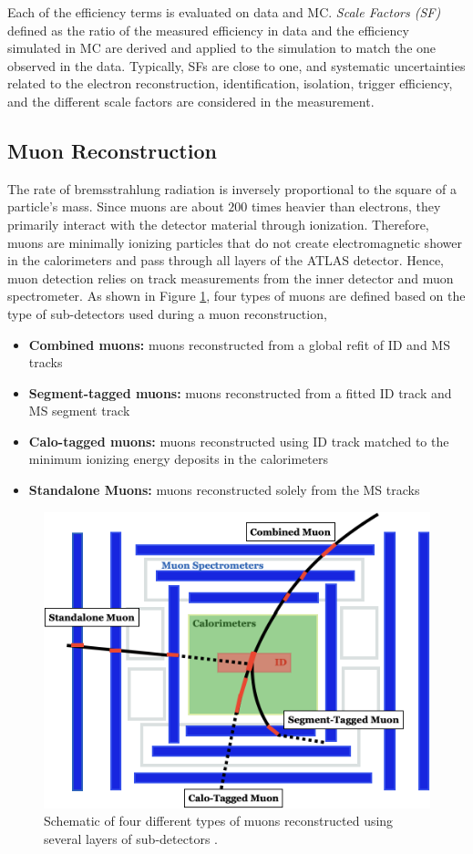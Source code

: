 Each of the efficiency terms is evaluated on data and MC. \textit{Scale Factors (SF)} defined as the ratio of the measured efficiency in data and the efficiency simulated in MC are derived and applied to the simulation to match the one observed in the data. Typically, SFs are close to one, and systematic uncertainties related to the electron reconstruction, identification, isolation, trigger efficiency, and the different scale factors are considered in the measurement.

\subsection{Muon Reconstruction}
\label{subsec:ParticleRecon_Muon}
The rate of bremsstrahlung radiation is inversely proportional to the square of a particle's mass. Since muons are about $200$ times heavier than electrons, they primarily interact with the detector material through ionization. Therefore, muons are minimally ionizing particles that do not create electromagnetic shower in the calorimeters and pass through all layers of the ATLAS detector. Hence, muon detection relies on track measurements from the inner detector and muon spectrometer. As shown in Figure \ref{fig:MuonFig}, four types of muons are defined based on the type of sub-detectors used during a muon reconstruction,

\begin{itemize}
    \item{\textbf{Combined muons:} muons reconstructed from a global refit of ID and MS tracks }
    \item{\textbf{Segment-tagged muons:} muons reconstructed from a fitted ID track and MS segment track } 
    \item{\textbf{Calo-tagged muons:}  muons reconstructed using ID track matched to the minimum ionizing energy deposits in the calorimeters}
    \item{\textbf{Standalone Muons:} muons reconstructed solely from the MS tracks }
\end{itemize}

\begin{figure}[!htb]
    \centering
    \includegraphics[width=0.7\linewidth]{figures/LHC/MuonTypes.png}
    \caption{ Schematic of four different types of muons reconstructed using several layers of sub-detectors \cite{MuonFig}.\label{fig:MuonFig}}
\end{figure}

